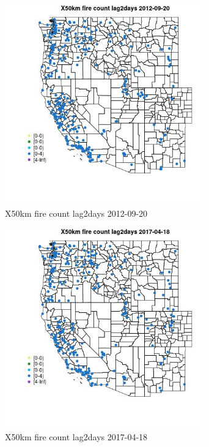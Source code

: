 \begin{figure} 
\centering  
\includegraphics[width=0.77\textwidth]{Code_Outputs/Report_ML_input_PM25_Step4_part_e_de_duplicated_aves_compiled_2019-05-14wNAs_MapObsX50km_fire_count_lag2days2012-09-20.jpg} 
\caption{\label{fig:Report_ML_input_PM25_Step4_part_e_de_duplicated_aves_compiled_2019-05-14wNAsMapObsX50km_fire_count_lag2days2012-09-20}X50km fire count lag2days 2012-09-20} 
\end{figure} 
 

\clearpage 

\begin{figure} 
\centering  
\includegraphics[width=0.77\textwidth]{Code_Outputs/Report_ML_input_PM25_Step4_part_e_de_duplicated_aves_compiled_2019-05-14wNAs_MapObsX50km_fire_count_lag2days2017-04-18.jpg} 
\caption{\label{fig:Report_ML_input_PM25_Step4_part_e_de_duplicated_aves_compiled_2019-05-14wNAsMapObsX50km_fire_count_lag2days2017-04-18}X50km fire count lag2days 2017-04-18} 
\end{figure} 
 

